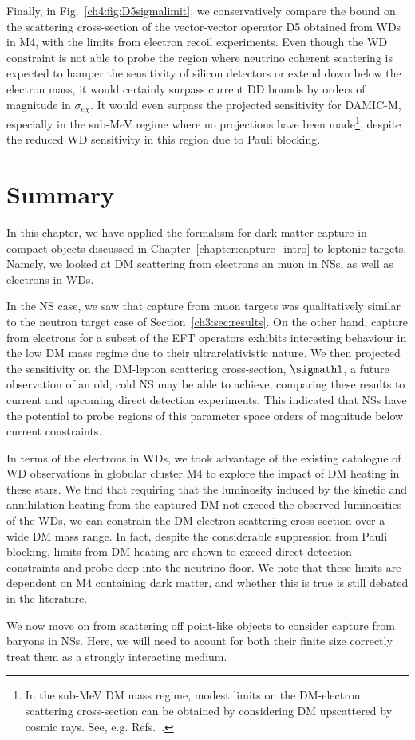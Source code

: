 Finally, in Fig.~\ref{ch4:fig:D5sigmalimit}, we conservatively compare the bound on the scattering cross-section of the vector-vector operator D5 obtained from WDs in M4, with the limits from electron recoil experiments. Even though the WD constraint is not able to probe the region where neutrino coherent scattering is expected to hamper the sensitivity of silicon detectors or extend down below the electron mass, it would certainly surpass current DD bounds by orders of magnitude in $\sigma_{e\chi}$. It would even surpass the projected sensitivity for DAMIC-M, especially in the sub-MeV regime where no projections have been made\footnote{In the sub-MeV DM mass regime, modest limits on the DM-electron scattering cross-section can be obtained by considering DM upscattered by cosmic rays. See, e.g. Refs.~\cite{Cappiello:2018hsu_Reversedirectdetection,Ema:2018bih_Lightdarkmatter,Dent:2020syp_oct_Presentfuturestatus}.}, despite the reduced WD sensitivity in this region due to Pauli blocking. 

\section{Summary}
\label{ch4:sec:summary}

In this chapter, we have applied the formalism for dark matter capture in compact objects discussed in Chapter~\ref{chapter:capture_intro} to leptonic targets. Namely, we looked at DM scattering from electrons an muon in NSs, as well as electrons in WDs.

In the NS case, we saw that capture from muon targets was qualitatively similar to the neutron target case of Section~\ref{ch3:sec:results}. On the other hand, capture from electrons for a subset of the EFT operators exhibits interesting behaviour in the low DM mass regime due to their ultrarelativistic nature. We then projected the sensitivity on the DM-lepton scattering cross-section, $\sigmathl$, a future observation of an old, cold NS may be able to achieve, comparing these results to current and upcoming direct detection experiments. This indicated that NSs have the potential to probe regions of this parameter space orders of magnitude below current constraints. 

In terms of the electrons in WDs, we took advantage of the existing catalogue of WD observations in globular cluster M4 to explore the impact of DM heating in these stars. We find that requiring that the luminosity induced by the kinetic and annihilation heating from the captured DM not exceed the observed luminosities of the WDs, we can constrain the DM-electron scattering cross-section over a wide DM mass range. In fact, despite the considerable suppression from Pauli blocking, limits from DM heating are shown to exceed direct detection constraints and probe deep into the neutrino floor. 
We note that these limits are dependent on M4 containing dark matter, and whether this is true is still debated in the literature. 

We now move on from scattering off point-like objects to consider capture from baryons in NSs. Here, we will need to acount for both their finite size correctly treat them as a strongly interacting medium. 